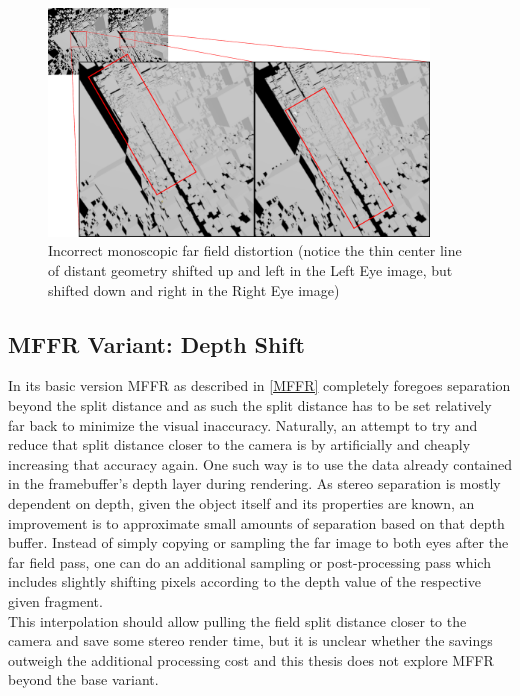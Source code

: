 \begin{figure}[h!]
  \centering
  \includegraphics[width=0.9\textwidth]{pictures/mffr_tilt_distortion}
  \caption{Incorrect monoscopic far field distortion (notice the thin center line of distant geometry shifted up and left in the Left Eye image, but shifted down and right in the Right Eye image)} \label{fig:distortion_MFFR}
\end{figure}

\subsection{\gls{MFFR} Variant: Depth Shift}  \label{MFFR_depthshift}
In its basic version \gls{MFFR} as described in \autoref{MFFR} completely foregoes separation beyond the split distance and as such the split distance has to be set relatively far back to minimize the visual inaccuracy. Naturally, an attempt to try and reduce that split distance closer to the camera is by artificially and cheaply increasing that accuracy again. One such way is to use the data already contained in the framebuffer's depth layer during rendering. As stereo separation is mostly dependent on depth, given the object itself and its properties are known, an improvement is to approximate small amounts of separation based on that depth buffer. Instead of simply copying or sampling the far image to both eyes after the far field pass, one can do an additional sampling or post-processing pass which includes slightly shifting pixels according to the depth value of the respective given fragment. \\
This interpolation should allow pulling the field split distance closer to the camera and save some stereo render time, but it is unclear whether the savings outweigh the additional processing cost and this thesis does not explore \gls{MFFR} beyond the base variant. 

